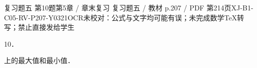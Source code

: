 \begin{bankitem}{复习题五 第10题}{第5章 / 章末复习 复习题五 / 教材 p.207 / PDF 第214页}{XJ-B1-C05-RV-P207-Y0321}{OCR未校对：公式与文字均可能有误；未完成数学TeX转写；禁止直接发给学生}
\begin{ocrdraft}
\par
10．
\par
上的最大值和最小值．
\end{ocrdraft}
\end{bankitem}
